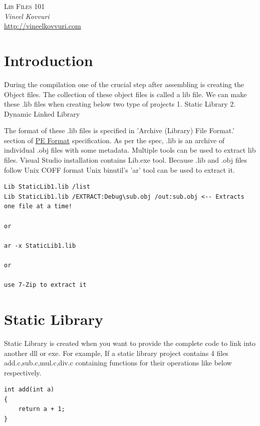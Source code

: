 \documentclass{article}
\begin{document}
\begin{titlepage}
   \begin{center}
      \Large\textsc{Lib Files 101}\\
      \vspace{5mm}
      \Large\textit{Vineel Kovvuri}\\
      \url{http://vineelkovvuri.com}\\
   \end{center}
\end{titlepage}

\newpage
\section{Introduction}
During the compilation one of the crucial step after assembling is
creating the Object files. The collection of these object files is
called a lib file. We can make these .lib files when creating below
two type of projects
1. Static Library
2. Dynamic Linked Library

The format of these .lib files is specified in 'Archive (Library) File Format.'
section of \href{https://docs.microsoft.com/en-us/windows/desktop/debug/pe-format#archive-library-file-format}{PE Format}
specification. As per the spec, .lib is an archive of individual .obj
files with some metadata. Multiple tools can be used to
extract lib files. Visual Studio installation contains Lib.exe tool.
Because .lib and .obj files follow Unix COFF format Unix binutil's
'ar' tool can be used to extract it.

\begin{verbatim}
Lib StaticLib1.lib /list
Lib StaticLib1.lib /EXTRACT:Debug\sub.obj /out:sub.obj <-- Extracts one file at a time!

or

ar -x StaticLib1.lib

or

use 7-Zip to extract it
\end{verbatim}

\section{Static Library}
Static Library is created when you want to provide the complete code to
link into another dll or exe. For example, If a static library
project contains 4 files add.c,sub.c,mul.c,div.c containing functions
for their operations like below respectively.
\begin{verbatim}
int add(int a)
{
    return a + 1;
}
\end{verbatim}
\end{document}
